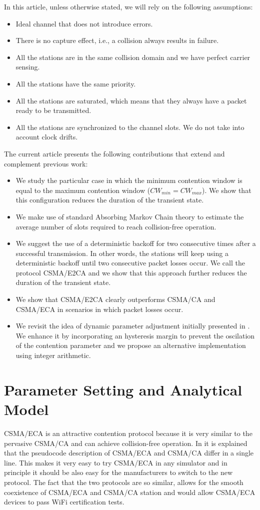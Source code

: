 \documentclass[journal]{IEEEtran}
\begin{document}
In this article, unless otherwise stated, we will rely on the following assumptions:
\begin{itemize}
\item Ideal channel that does not introduce errors.
\item There is no capture effect, i.e., a collision always results in failure.
\item All the stations are in the same collision domain and we have perfect carrier sensing.
\item All the stations have the same priority.
\item All the stations are saturated, which means that they always have a packet ready to be transmitted.
\item All the stations are synchronized to the channel slots. We do not take into account clock drifts.
\end{itemize}

The current article presents the following contributions that extend and complement previous work:
\begin{itemize} 
\item We study the particular case in which the minimum contention window is equal to the maximum contention window ($CW_{min}=CW_{max}$). We show that this configuration reduces the duration of the transient state.
\item We make use of standard Absorbing Markov Chain theory to estimate the average number of slots required to reach collision-free operation.
\item We suggest the use of a deterministic backoff for two consecutive times after a successful transmission. In other words, the stations will keep using a deterministic backoff until two consecutive packet losses occur. We call the protocol CSMA/E2CA and we show that this approach further reduces the duration of the transient state.
\item We show that CSMA/E2CA clearly outperforms CSMA/CA and CSMA/ECA in scenarios in which packet losses occur.
\item We revisit the idea of dynamic parameter adjustment initially presented in \cite{barcelo2010dpa}. We enhance it by incorporating an hysteresis margin to prevent the oscilation of the contention parameter and we propose an alternative implementation using integer arithmetic. 
\end{itemize}

\section{Parameter Setting and Analytical Model}
\label{sec:analysis}
CSMA/ECA is an attractive contention protocol because it is very similar to the pervasive CSMA/CA and can achieve collision-free operation. In \cite{barcelo2010fcc} it is explained that the pseudocode description of CSMA/ECA and CSMA/CA differ in a single line. This makes it very easy to try CSMA/ECA in any simulator and in principle it should be also easy for the manufacturers to switch to the new protocol. The fact that the two protocols are so similar, allows for the smooth coexistence of CSMA/ECA and CSMA/CA station and would allow CSMA/ECA devices to pass WiFi certification tests.
\end{document}

